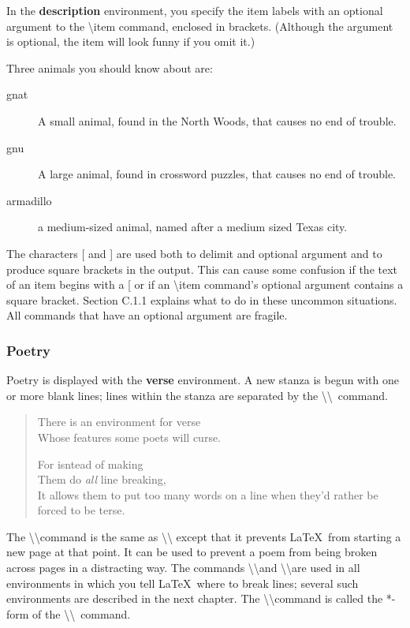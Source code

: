\documentclass[twocolumn]{article}        %
\begin{document}
In the \textbf{description} environment, you specify the item labels with an optional 
argument to the \textbackslash item command, enclosed in brackets. (Although the argument
is optional, the item will look funny if you omit it.)

Three animals you should know about are:
\begin{description}
    \item[gnat] A small animal, found in the North Woods, that causes no end of trouble.
    \item[gnu] A large animal, found in crossword puzzles, that causes no end of trouble.
    \item[armadillo] a medium-sized animal, named after a medium sized Texas city. 
\end{description}

The characters [ and ] are used both to delimit and optional argument and to produce square
brackets in the output. This can cause some confusion if the text of an item begins with a [ 
or if an \textbackslash item command's optional argument contains a square bracket. 
Section C.1.1 explains what to do in these uncommon situations. All commands that have an 
optional argument are fragile.

\subsubsection*{Poetry}

Poetry is displayed with the \textbf{verse} environment. A new stanza is begun with 
one or more blank lines; lines within the stanza are separated by the 
\textbackslash \textbackslash\ command.

\begin{verse}
    There is an environment for verse \\
    Whose features some poets will curse.

    For isntead of making\\
    Them do {\em all\/} line breaking, \\
    It allows them to put too many words on a line 
    when they'd rather be forced to be terse.
\end{verse}

The \textbackslash \textbackslash * command is the same as \textbackslash \textbackslash
except that it prevents \LaTeX\ from starting a new page at that point. It can be used to
prevent a poem from being broken across pages in a distracting way. The commands
\textbackslash \textbackslash and \textbackslash \textbackslash * are used in all
environments in which you tell \LaTeX\ where to break lines; several such environments 
are described in the next chapter. The \textbackslash \textbackslash * command is called 
the *-form of the \textbackslash \textbackslash\ command. 
\end{document}
